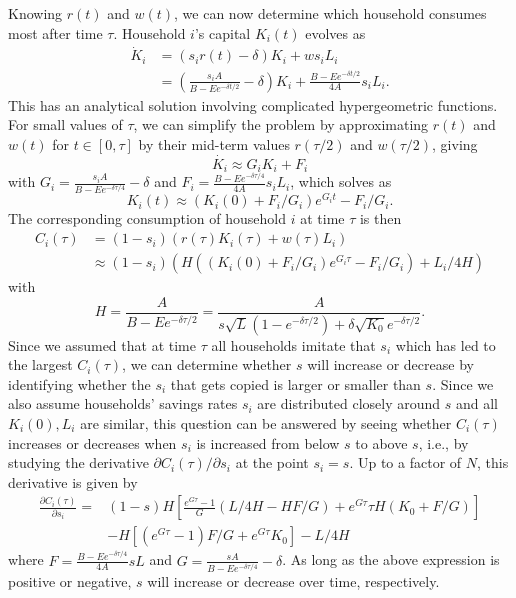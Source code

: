 Knowing $r(t)$ and $w(t)$, we can now determine which household consumes most after time $\tau$.
Household $i$'s capital $K_i(t)$ evolves as 
\begin{equation}
\begin{split}
    \dot K_i 
    &= (s_i r(t) - \delta) K_i + w s_i L_i \nonumber \\
    &= \left(\frac{s_i A}{B - E e^{-\delta t/2}} - \delta\right) K_i
        + \frac{B - E e^{-\delta t/2}}{4 A} s_i L_i.
\end{split}
\end{equation}
This has an analytical solution involving complicated hypergeometric functions.
For small values of $\tau$, we can simplify the problem by approximating $r(t)$ and $w(t)$ for $t\in[0,\tau]$ by their mid-term values $r(\tau/2)$ and $w(\tau/2)$, giving
\begin{equation*}
\dot{K_i} \approx G_i K_i + F_i
\end{equation*}
with $G_i = \frac{s_i A}{B - E e^{-\delta \tau/4}} - \delta$
and $F_i = \frac{B - E e^{-\delta \tau/4}}{4 A} s_i L_i$,
which solves as
\begin{equation*}
    K_i(t) \approx (K_i(0) + F_i/G_i)e^{G_i t} - F_i/G_i.
\end{equation*}
The corresponding consumption of household $i$ at time $\tau$ is then
\begin{align}
    C_i(\tau) 
    &= (1 - s_i)(r(\tau) K_i(\tau) + w(\tau) L_i) \nonumber \\
    &\approx (1 - s_i)\left( 
        H((K_i(0) + F_i/G_i)e^{G_i\tau} - F_i/G_i)
        + L_i/4 H
    \right)
\label{eq:Citau}
\end{align}
with 
\begin{equation}
        H = \frac{A}{B - E e^{-\delta\tau/2}} = \frac{A}{s\sqrt L (1 - e^{-\delta\tau/2}) + \delta \sqrt{K_0} e^{-\delta\tau/2}}.\nonumber
\end{equation}
Since we assumed that at time $\tau$ all households imitate that $s_i$ which has led to the largest $C_i(\tau)$,
we can determine whether $s$ will increase or decrease by identifying whether the $s_i$ that gets copied is larger or smaller than $s$.
Since we also assume households' savings rates $s_i$ are distributed closely around $s$ and all $K_i(0), L_i$ are similar, this question can be answered by seeing whether $C_i(\tau)$ increases or decreases when $s_i$ is increased from below $s$ to above $s$, i.e., by studying the derivative $\partial C_i(\tau)/\partial s_i$ at the point $s_i = s$. Up to a factor of $N$, this derivative is given by
\begin{align}
  \frac{\partial C_i(\tau)}{\partial s_i} = &(1 - s) H\left[
        \frac{e^{G\tau} - 1}{G}(L / 4 H - H F/G) + e^{G\tau}\tau H (K_0 + F/G)\right] \nonumber \\
    &- H[(e^{G\tau} - 1) F/G + e^{G\tau} K_0] 
    - L / 4 H
    \label{sdotnew}
\end{align}
where $F = \frac{B - E e^{-\delta \tau/4}}{4 A} s L$ and
$G = \frac{s A}{B - E e^{-\delta \tau/4}} - \delta$.
As long as the above expression is positive or negative, $s$ will increase or decrease over time, respectively.

